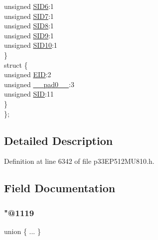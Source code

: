 \begin{DoxyCompactItemize}
\begin{tabbing}
\>\>unsigned \hyperlink{structtag_c2_r_x_f3_s_i_d_b_i_t_s_a70d70952133eb2389d5c326f9f0e8035}{SID6}:1\\
\>\>unsigned \hyperlink{structtag_c2_r_x_f3_s_i_d_b_i_t_s_a34097fb76decd431701fa2d86a22328e}{SID7}:1\\
\>\>unsigned \hyperlink{structtag_c2_r_x_f3_s_i_d_b_i_t_s_afe74894633244fdb0b0c01b4e8c522e7}{SID8}:1\\
\>\>unsigned \hyperlink{structtag_c2_r_x_f3_s_i_d_b_i_t_s_a33587704948067005c2a6a3ccc503c99}{SID9}:1\\
\>\>unsigned \hyperlink{structtag_c2_r_x_f3_s_i_d_b_i_t_s_a1a9084031c7f5fb16007feeebf0d8216}{SID10}:1\\
\>\} \\
\>struct \{\\
\>\>unsigned \hyperlink{structtag_c2_r_x_f3_s_i_d_b_i_t_s_ae80b378c9141f7c03e0b4e55b5f4b54d}{EID}:2\\
\>\>unsigned \hyperlink{structtag_c2_r_x_f3_s_i_d_b_i_t_s_adf71f3d8410c1f1dbbc96680a92c49af}{\_\_pad0\_\_}:3\\
\>\>unsigned \hyperlink{structtag_c2_r_x_f3_s_i_d_b_i_t_s_af88edf93b2fee2432665bd84f51287e4}{SID}:11\\
\>\} \\
\}; \\

\end{tabbing}\end{DoxyCompactItemize}


\subsection{Detailed Description}


Definition at line 6342 of file p33\+E\+P512\+M\+U810.\+h.



\subsection{Field Documentation}
\mbox{\label{structtag_c2_r_x_f3_s_i_d_b_i_t_s_accd381abf52681bf8ff8bfe66f0c1fdb}} 
\subsubsection{\texorpdfstring{"@1119}{@1119}}
{\footnotesize\ttfamily union \{ ... \} }

\mbox{\label{structtag_c2_r_x_f3_s_i_d_b_i_t_s_adf71f3d8410c1f1dbbc96680a92c49af}} 
